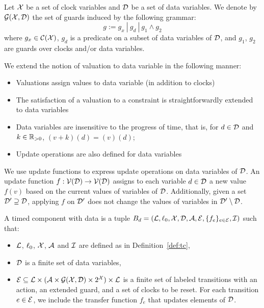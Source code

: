 \begin{definition}\label{def:guard}
  Let $\mathcal{X}$ be a set of clock variables and $\mathcal{D}$ be a set of
  data variables. We denote by $\mathcal{G(X,D)}$ the set of guards induced
  by the following grammar:
  \begin{displaymath}
    g:=g_x \ | \ g_d \ | \ g_1\wedge g_2
  \end{displaymath}
  where $g_x\in\mathcal{C(X)}$, $g_d$ is a predicate on a subset of data variables
  of $\mathcal{D}$, and $g_1$, $g_2$ are guards over clocks and/or data variables.
\end{definition}

We extend the notion of valuation to data variable in the following manner:
\begin{itemize}
  \item Valuations assign values to data variable (in addition to clocks)
  \item The satisfaction of a valuation to a constraint is straightforwardly 
    extended to data variables
  \item Data variables are insensitive to the progress of time, that is, for $d\in\mathcal{D}$ and
    $k\in\mathbb{R}_{> 0}$, $(v+k)(d)=(v)(d)$;
  \item Update operations are also defined for data variables 
\end{itemize}

We use update functions to express update operations on data variables of $\mathcal{D}$. An update function
$f:\mathcal{V}(\mathcal{D})\to\mathcal{V}(\mathcal{D})$ assigns to each variable $d\in\mathcal{D}$ a new value $f(v)$ based on the
current values of variables of $\mathcal{D}$. Additionally, given a set $\mathcal{D}'\supseteq\mathcal{D}$, applying $f$
on $\mathcal{D}'$ does not change the values of variables in $\mathcal{D}'\setminus\mathcal{D}$.

\begin{definition}\label{def:tce}
  A timed component with data is a tuple 
  $B_d=(\mathcal{L},\ell_0,\mathcal{X},\mathcal{D},\mathcal{A},\mathcal{E},\{f_e\}_{e\in\mathcal{E}},\mathcal{I})$ such that:
  \begin{itemize}
    \item $\mathcal{L}$, $\ell_0$, $\mathcal{X}$, $\mathcal{A}$ and $\mathcal{I}$ are defined as
      in Definition~\ref{def:tc},
    \item $\mathcal{D}$ is a finite set of data variables,
    \item $\mathcal{E}\subseteq\mathcal{L}\times(\mathcal{A}\times\mathcal{G(X,D)}\times2^{\mathcal{X}})\times\mathcal{L}$
    is a finite set of labeled transitions with an action, an extended guard, 
      and a set of clocks to be reset. For each transition $e\in\mathcal{E}$, we include the transfer
      function $f_e$ that updates elements of $\mathcal{D}$. 
  \end{itemize}
\end{definition}

